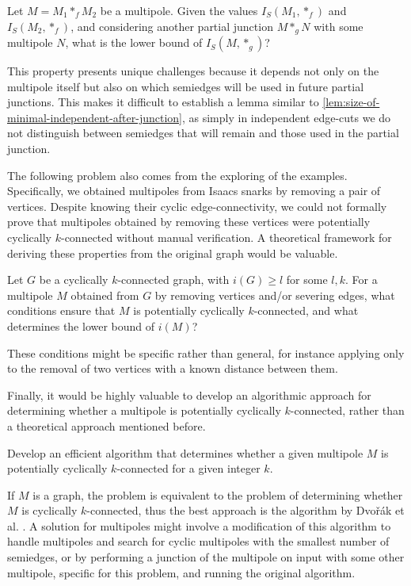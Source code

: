 \documentclass[12pt, twoside]{book}
\begin{document}
\begin{problem}
	Let $M=M_1*_fM_2$ be a multipole. Given the values $I_S(M_1,*_f)$ and $I_S(M_2,*_f)$, and considering another partial junction $M*_gN$ with some multipole $N$, what is the lower bound of $I_S(M,*_g)$?
\end{problem}

This property presents unique challenges because it depends not only on the multipole itself but also on which semiedges will be used in future partial junctions. This makes it difficult to establish a lemma similar to \cref{lem:size-of-minimal-independent-after-junction}, as simply in independent edge-cuts we do not distinguish between semiedges that will remain and those used in the partial junction.

The following problem also comes from the exploring of the examples. Specifically, we obtained multipoles from Isaacs snarks by removing a pair of vertices. Despite knowing their cyclic edge-connectivity, we could not formally prove that multipoles obtained by removing these vertices were potentially cyclically $k$-connected without manual verification. A theoretical framework for deriving these properties from the original graph would be valuable.

\begin{problem}
	Let $G$ be a cyclically $k$-connected graph, with $i(G)\geq l$ for some $l,k$. For a multipole $M$ obtained from $G$ by removing vertices and/or severing edges, what conditions ensure that $M$ is potentially cyclically $k$-connected, and what determines the lower bound of $i(M)$?
\end{problem}

These conditions might be specific rather than general, for instance applying only to the removal of two vertices with a known distance between them.

Finally, it would be highly valuable to develop an algorithmic approach for determining whether a multipole is potentially cyclically $k$-connected, rather than a theoretical approach mentioned before.

\begin{problem}
	Develop an efficient algorithm that determines whether a given multipole $M$ is potentially cyclically $k$-connected for a given integer $k$.
\end{problem}

If $M$ is a graph, the problem is equivalent to the problem of determining whether $M$ is cyclically $k$-connected, thus the best approach is the algorithm by Dvořák et al. \cite{Dvorak2004}. A solution for multipoles might involve a modification of this algorithm to handle multipoles and search for cyclic multipoles with the smallest number of semiedges, or by performing a junction of the multipole on input with some other multipole, specific for this problem, and running the original algorithm.
\end{document}
